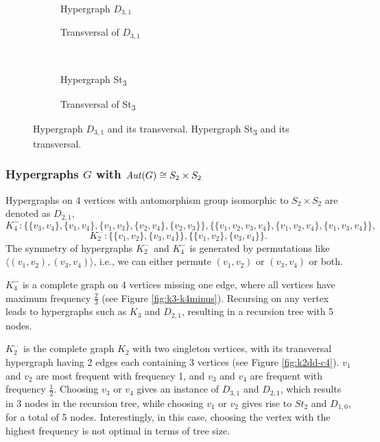 \begin{figure}[tp]
\centering
\begin{subfigure}{0.45\linewidth}\centering\caption{Hypergraph $D_{3,1}$}\end{subfigure}\hfill
\begin{subfigure}{0.45\linewidth}\centering\caption{Transversal of $D_{3,1}$}\end{subfigure}\\[8pt]
\begin{subfigure}{0.45\linewidth}\centering\caption{Hypergraph St\textsubscript{3}}\end{subfigure}\hfill
\begin{subfigure}{0.45\linewidth}\centering\caption{Transversal of St\textsubscript{3}}\end{subfigure}
\caption{Hypergraph $D_{3,1}$ and its transversal. Hypergraph St\textsubscript{3} and its transversal.}\label{fig:d31-st3}
\end{figure}

\subsubsection*{Hypergraphs $G$ with $\mathit{Aut}(G)\cong S_2\times S_2$}

Hypergraphs on 4 vertices with automorphism group isomorphic to $S_2\times S_2$ are denoted as $D_{2,1}$,
\[
K_4^-:\{\{v_3,v_4\},\{v_1,v_4\},\{v_1,v_3\},\{v_2,v_4\},\{v_2,v_3\}\},\{\{v_1,v_2,v_3,v_4\},\{v_1,v_2,v_4\},\{v_1,v_3,v_4\}\},
\]
\[
K_2^{\cdot\cdot}:\{\{v_1,v_2\},\{v_3,v_4\}\},\{\{v_1,v_2\},\{v_3,v_4\}\}.
\]
The symmetry of hypergraphs $K_2^{\cdot\cdot}$ and $K_4^-$ is generated by permutations like $\langle(v_1,v_2),(v_3,v_4)\rangle$, i.e., we can either permute $(v_1,v_2)$ or $(v_3,v_4)$ or both.

$K_4^-$ is a complete graph on 4 vertices missing one edge, where all vertices have maximum frequency $\frac{2}{3}$ (see Figure \ref{fig:k3-k4minus}). Recursing on any vertex leads to hypergraphs such as $K_3$ and $D_{2,1}$, resulting in a recursion tree with 5 nodes.

$K_2^{\cdot\cdot}$ is the complete graph $K_2$ with two singleton vertices, with its transversal hypergraph having 2 edges each containing 3 vertices (see Figure \ref{fig:k2dd-c4}). $v_1$ and $v_2$ are most frequent with frequency 1, and $v_3$ and $v_4$ are frequent with frequency $\frac{1}{2}$. Choosing $v_3$ or $v_4$ gives an instance of $D_{3,1}$ and $D_{2,1}$, which results in 3 nodes in the recursion tree, while choosing $v_1$ or $v_2$ gives rise to $St_2$ and $D_{1,0}$, for a total of 5 nodes. Interestingly, in this case, choosing the vertex with the highest frequency is not optimal in terms of tree size.

